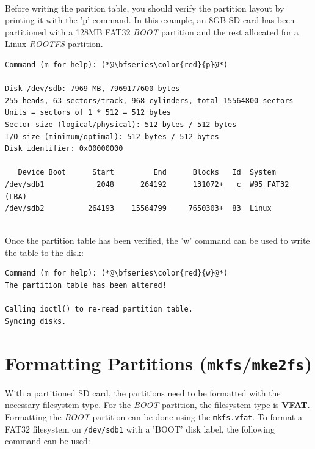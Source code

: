 
~\\
\noindent
Before writing the parition table, you should verify the partition layout by printing it with the 'p' command. In this example, an 8GB SD card has been partitioned with a 128MB FAT32 \textit{BOOT} partition and the rest allocated for a Linux \textit{ROOTFS} partition. \\

\begin{lstlisting}[style=text]
Command (m for help): (*@\bfseries\color{red}{p}@*)

Disk /dev/sdb: 7969 MB, 7969177600 bytes
255 heads, 63 sectors/track, 968 cylinders, total 15564800 sectors
Units = sectors of 1 * 512 = 512 bytes
Sector size (logical/physical): 512 bytes / 512 bytes
I/O size (minimum/optimal): 512 bytes / 512 bytes
Disk identifier: 0x00000000

   Device Boot      Start         End      Blocks   Id  System
/dev/sdb1            2048      264192      131072+   c  W95 FAT32 (LBA)
/dev/sdb2          264193    15564799     7650303+  83  Linux
\end{lstlisting}

~\\
\noindent
Once the partition table has been verified, the 'w' command can be used to write the table to the disk: \\
\begin{lstlisting}[style=text]
Command (m for help): (*@\bfseries\color{red}{w}@*)
The partition table has been altered!

Calling ioctl() to re-read partition table.
Syncing disks.
\end{lstlisting}

\section{Formatting Partitions (\texttt{mkfs}/\texttt{mke2fs})}
With a partitioned SD card, the partitions need to be formatted with the necessary filesystem type. For the \textit{BOOT} partition, the filesystem type is \textbf{VFAT}. Formatting the \textit{BOOT} partition can be done using the \texttt{mkfs.vfat}. To format a FAT32 filesystem on \texttt{/dev/sdb1} with a 'BOOT' disk label, the following command can be used: \\

